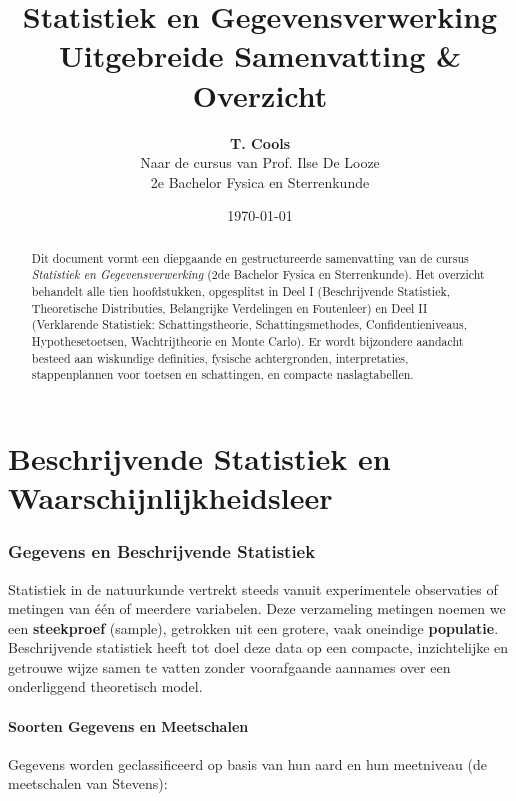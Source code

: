 \documentclass[11pt,a4paper]{article}
\title{\Huge\bfseries\color{primaryblue} Statistiek en Gegevensverwerking \\ \vspace{0.3em} \LARGE Uitgebreide Samenvatting \& Overzicht}
\author{\textbf{T. Cools} \\ Naar de cursus van Prof. Ilse De Looze \\ 2e Bachelor Fysica en Sterrenkunde}
\date{\today}
\begin{document}
\maketitle
\vspace{-1.5em}

\begin{abstract}
\noindent Dit document vormt een diepgaande en gestructureerde samenvatting van de cursus \emph{Statistiek en Gegevensverwerking} (2de Bachelor Fysica en Sterrenkunde). Het overzicht behandelt alle tien hoofdstukken, opgesplitst in Deel I (Beschrijvende Statistiek, Theoretische Distributies, Belangrijke Verdelingen en Foutenleer) en Deel II (Verklarende Statistiek: Schattingstheorie, Schattingsmethodes, Confidentieniveaus, Hypothesetoetsen, Wachtrijtheorie en Monte Carlo). Er wordt bijzondere aandacht besteed aan wiskundige definities, fysische achtergronden, interpretaties, stappenplannen voor toetsen en schattingen, en compacte naslagtabellen.
\end{abstract}

\vspace{1em}
\tableofcontents
\newpage

\part{Beschrijvende Statistiek en Waarschijnlijkheidsleer}

\section{Gegevens en Beschrijvende Statistiek}

Statistiek in de natuurkunde vertrekt steeds vanuit experimentele observaties of metingen van één of meerdere variabelen. Deze verzameling metingen noemen we een \textbf{steekproef} (sample), getrokken uit een grotere, vaak oneindige \textbf{populatie}. Beschrijvende statistiek heeft tot doel deze data op een compacte, inzichtelijke en getrouwe wijze samen te vatten zonder voorafgaande aannames over een onderliggend theoretisch model.

\subsection{Soorten Gegevens en Meetschalen}
Gegevens worden geclassificeerd op basis van hun aard en hun meetniveau (de meetschalen van Stevens):
\end{document}
